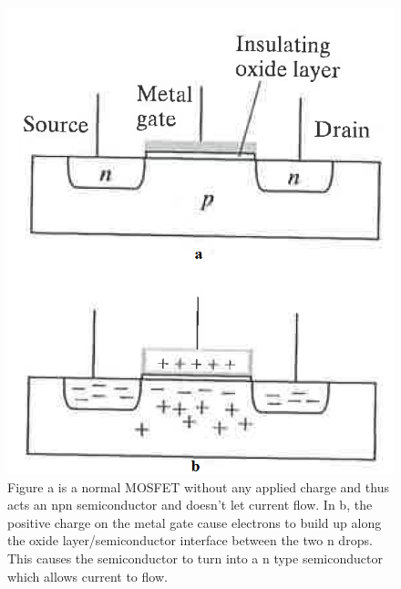 \documentclass[ notitlepage, numerical, 11pt]{revtex4-1} %
\begin{document}
\begin{figure}[H]
\centerline{\includegraphics[scale=.45]{mosfet.png}}
\caption{Figure a is a normal MOSFET without any applied charge and thus acts an npn semiconductor and doesn't let current flow. In b, the positive charge on the metal gate cause electrons to build up along the oxide layer/semiconductor interface between the two n drops. This causes the semiconductor to turn into a n type semiconductor which allows current to flow.}
\label{mosfet}
\end{figure}
\end{document}
